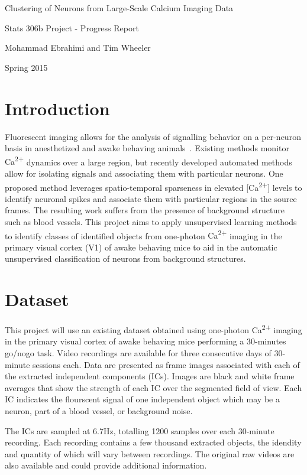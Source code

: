\documentclass[10pt]{article}
\newcommand{\calcium}[0]{Ca\textsuperscript{2+}}
\begin{document}
\begin{center}
    {\LARGE Clustering of Neurons from Large-Scale Calcium Imaging Data}

    Stats 306b Project - Progress Report

    Mohammad Ebrahimi and Tim Wheeler

    Spring 2015
\end{center}

\section{Introduction}

Fluorescent imaging allows for the analysis of signalling behavior on a per-neuron basis in anesthetized and awake behaving animals~\cite{Mukamel2009}. 
Existing methods monitor {\calcium} dynamics over a large region, but recently developed automated methods allow for isolating signals and associating them with particular neurons.
One proposed method leverages spatio-temporal sparseness in elevated [\calcium] levels to identify neuronal spikes and associate them with particular regions in the source frames.
The resulting work suffers from the presence of background structure such as blood vessels.
This project aims to apply unsupervised learning methods to identify classes of identified objects from one-photon {\calcium} imaging in the primary visual cortex (V1) of awake behaving mice to aid in the automatic unsupervised classification of neurons from background structures.

\section{Dataset}

This project will use an existing dataset obtained using one-photon {\calcium} imaging in the primary visual cortex of awake behaving mice performing a \num{30}-minutes go/nogo task.
Video recordings are available for three consecutive days of \num{30}-minute sessions each.
Data are presented as frame images associated with each of the extracted independent components (ICs).
Images are black and white frame averages that show the strength of each IC over the segmented field of view. 
Each IC indicates the flourscent signal of one independent object which may be a neuron, part of a blood vessel, or background noise.

The ICs are sampled at \num{6.7}\si{Hz}, totalling \num{1200} samples over each \num{30}-minute recording. 
Each recording contains a few thousand extracted objects, the idendity and quantity of which will vary between recordings.
The original raw videos are also available and could provide additional information.
\end{document}
